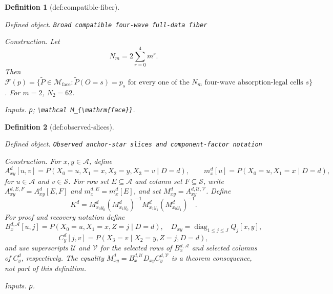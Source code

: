 \documentclass{article}
\newtheorem{definition}{Definition}
\begin{document}
\begin{definition}[def:compatible-fiber]\label{def:compatible-fiber}
\par\smallskip\noindent\emph{Defined object.} \texttt{Broad compatible four-\allowbreak{}wave full-\allowbreak{}data fiber}
\par\smallskip\noindent\emph{Construction.} Let
\[
 N_m=2\sum_{r=0}^{4}m^r.
\]
Then \(\mathcal F(p)=\{\widetilde P\in\mathcal M_{\mathrm{face}}:\widetilde P(O=s)=p_s\text{ for every one of the }N_m\text{ four-wave absorption-legal cells }s\}\). For \(m=2\), \(N_2=62\).
\par\smallskip\noindent\emph{Inputs.} \texttt{p}; \texttt{\textbackslash{}\allowbreak{}mathcal M\_\allowbreak{}\{\textbackslash{}\allowbreak{}mathrm\{face\}\allowbreak{}\}\allowbreak{}}.
\end{definition}

\begin{definition}[def:observed-slices]\label{def:observed-slices}
\par\smallskip\noindent\emph{Defined object.} \texttt{Observed anchor-\allowbreak{}star slices and component-\allowbreak{}factor notation}
\par\smallskip\noindent\emph{Construction.} For \(x,y\in\mathcal A\), define
\[
 A_{xy}^d[u,v]=P(X_0=u,X_1=x,X_2=y,X_3=v\mid D=d),
 \qquad
 m_x^d[u]=P(X_0=u,X_1=x\mid D=d),
\]
for \(u\in\mathcal A\) and \(v\in\mathcal S\). For row set \(E\subseteq\mathcal A\) and column set \(F\subseteq\mathcal S\), write \(A_{xy}^{d,E,F}=A_{xy}^d[E,F]\) and \(m_x^{d,E}=m_x^d[E]\), and set \(M_{xy}^d=A_{xy}^{d,\mathcal U,\mathcal V}\). Define
\[
 K^d=M_{x_0y_0}^d(M_{x_1y_0}^d)^{-1}M_{x_1y_1}^d(M_{x_0y_1}^d)^{-1}.
\]
For proof and recovery notation define
\[
 B_x^{d,\mathcal A}[u,j]=P(X_0=u,X_1=x,Z=j\mid D=d),\quad
 D_{xy}=\operatorname{diag}_{1\leq j\leq J}Q_j[x,y],
\]
\[
 C_y^d[j,v]=P(X_3=v\mid X_2=y,Z=j,D=d),
\]
and use superscripts \(\mathcal U\) and \(\mathcal V\) for the selected rows of \(B_x^{d,\mathcal A}\) and selected columns of \(C_y^d\), respectively. The equality \(M_{xy}^d=B_x^{d,\mathcal U}D_{xy}C_y^{d,\mathcal V}\) is a theorem consequence, not part of this definition.
\par\smallskip\noindent\emph{Inputs.} \texttt{p}.
\end{definition}
\end{document}
